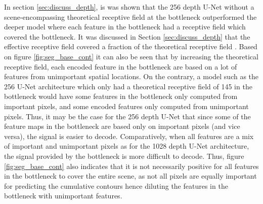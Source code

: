 \documentclass[../main/thesis]{subfiles}
\begin{document}
In section \ref{sec:discuss_depth}, is was shown that the 256 depth U-Net without a scene-encompassing theoretical receptive field at the bottleneck outperformed the deeper model where each feature in the bottleneck had a receptive field which covered the bottleneck. It was discussed in Section \ref{sec:discuss_depth} that the effective receptive field covered a fraction of the theoretical receptive field \citep{Luo2017}. Based on figure \ref{fig:seg_base_cont} it can also be seen that by increasing the theoretical receptive field, each encoded feature in the bottleneck are based on a lot of features from unimportant spatial locations. On the contrary, a model such as the 256 U-Net architecture which only had a theoretical receptive field of 145 in the bottleneck would have some features in the bottleneck only computed from important pixels, and some encoded features only computed from unimportant pixels. Thus, it may be the case for the 256 depth U-Net that since some of the feature maps in the bottleneck are based only on important pixels (and vice versa), the signal is easier to decode. Comparatively, when all features are a mix of important and unimportant pixels as for the 1028 depth U-Net architecture, the signal provided by the bottleneck is more difficult to decode. Thus, figure \ref{fig:seg_base_cont} also indicates that it is not necessarily positive for all features in the bottleneck to cover the entire scene, as not all pixels are equally important for predicting the cumulative contours hence diluting the features in the bottleneck with unimportant features.
\end{document}
